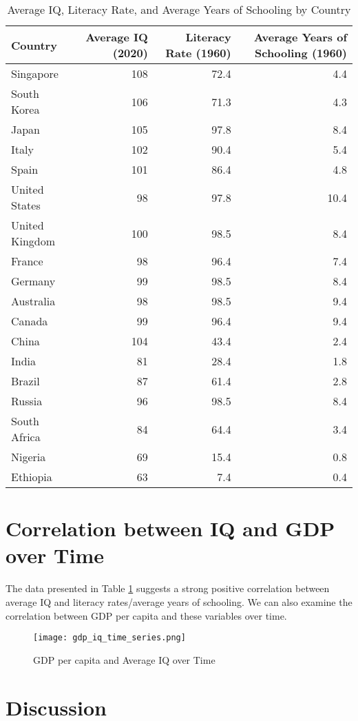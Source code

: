 \documentclass{article}
\begin{document}
\begin{table}[h!]
\centering
\begin{tabular}{lrrr}
\toprule
Country & Average IQ (2020) & Literacy Rate (1960) & Average Years of Schooling (1960) \\
\midrule
Singapore &108 &72.4 &4.4 \\
South Korea &106 &71.3 &4.3 \\
Japan &105 &97.8 &8.4 \\
Italy &102 &90.4 &5.4 \\
Spain &101 &86.4 &4.8 \\
United States &98 &97.8 &10.4 \\
United Kingdom &100 &98.5 &8.4 \\
France &98 &96.4 &7.4 \\
Germany &99 &98.5 &8.4 \\
Australia &98 &98.5 &9.4 \\
Canada &99 &96.4 &9.4 \\
China &104 &43.4 &2.4 \\
India &81 &28.4 &1.8 \\
Brazil &87 &61.4 &2.8 \\
Russia &96 &98.5 &8.4 \\
South Africa &84 &64.4 &3.4 \\
Nigeria &69 &15.4 &0.8 \\
Ethiopia &63 &7.4 &0.4 \\
\bottomrule
\end{tabular}
\caption{Average IQ, Literacy Rate, and Average Years of Schooling by Country}
\label{tab:iq_literacy}
\end{table}

\section{Correlation between IQ and GDP over Time}

The data presented in Table \ref{tab:iq_literacy} suggests a strong positive correlation between average IQ and literacy rates/average years of schooling. We can also examine the correlation between GDP per capita and these variables over time.

\begin{figure}[h!]
\centering
\texttt{[image: gdp\_iq\_time\_series.png]}
\caption{GDP per capita and Average IQ over Time}
\label{fig:gdp_iq_time_series}
\end{figure}

\section{Discussion}
\end{document}
